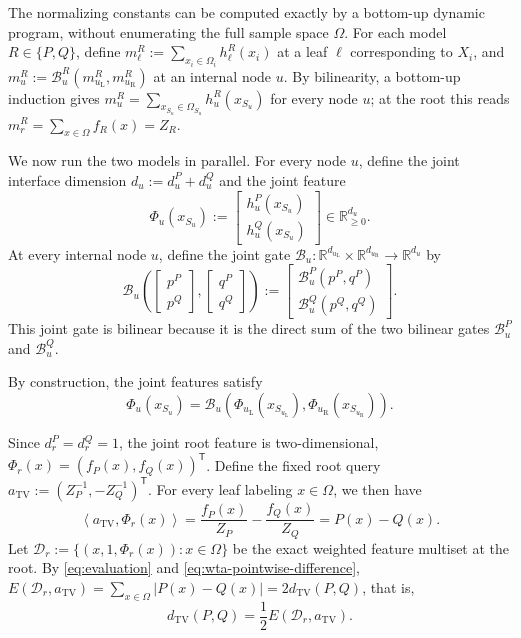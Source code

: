 \documentclass{article}
\begin{document}
The normalizing constants can be computed exactly by a bottom-up dynamic program, without enumerating the full sample space $\Omega$. For each model $R\in\{P,Q\}$, define $m_\ell^R:=\sum_{x_i\in\Omega_i}h_\ell^R(x_i)$ at a leaf $\ell$ corresponding to $X_i$, and $m_u^R:=\mathcal B_u^R(m_{u_{\mathrm L}}^R,m_{u_{\mathrm R}}^R)$ at an internal node $u$. By bilinearity, a bottom-up induction gives $m_u^R=\sum_{x_{S_u}\in\Omega_{S_u}}h_u^R(x_{S_u})$ for every node $u$; at the root this reads $m_r^R=\sum_{x\in\Omega}f_R(x)=Z_R$.

We now run the two models in parallel. For every node $u$, define the joint interface dimension $d_u:=d_u^P+d_u^Q$ and the joint feature
\begin{equation*}
\Phi_u(x_{S_u}) := \begin{bmatrix} h_u^P(x_{S_u})\\ h_u^Q(x_{S_u}) \end{bmatrix} \in\mathbb R_{\geq0}^{d_u}.
\end{equation*}
At every internal node $u$, define the joint gate $\mathcal B_u:\mathbb R^{d_{u_{\mathrm L}}}\times\mathbb R^{d_{u_{\mathrm R}}}\to\mathbb R^{d_u}$ by
\begin{equation*}
\mathcal B_u\left(\begin{bmatrix}p^P\\p^Q\end{bmatrix},\begin{bmatrix}q^P\\q^Q\end{bmatrix}\right) := \begin{bmatrix} \mathcal B_u^P(p^P,q^P)\\ \mathcal B_u^Q(p^Q,q^Q) \end{bmatrix}.
\end{equation*}
This joint gate is bilinear because it is the direct sum of the two bilinear gates $\mathcal B_u^P$ and $\mathcal B_u^Q$.

By construction, the joint features satisfy
\begin{equation*}
\Phi_u(x_{S_u}) = \mathcal B_u\left(\Phi_{u_{\mathrm L}}(x_{S_{u_{\mathrm L}}}), \Phi_{u_{\mathrm R}}(x_{S_{u_{\mathrm R}}})\right).
\end{equation*}

Since $d_r^P=d_r^Q=1$, the joint root feature is two-dimensional, $\Phi_r(x)=(f_P(x),f_Q(x))^{\mathsf T}$. Define the fixed root query $a_{\mathrm{TV}}:=(Z_P^{-1},-Z_Q^{-1})^{\mathsf T}$. For every leaf labeling $x\in\Omega$, we then have
\begin{equation}
\label{eq:wta-pointwise-difference}
\left\langle a_{\mathrm{TV}},\Phi_r(x)\right\rangle = \frac{f_P(x)}{Z_P}-\frac{f_Q(x)}{Z_Q} = P(x)-Q(x).
\end{equation}
Let $\mathcal D_r:=\{(x,1,\Phi_r(x)):x\in\Omega\}$ be the exact weighted feature multiset at the root. By \eqref{eq:evaluation} and \eqref{eq:wta-pointwise-difference}, $E(\mathcal D_r,a_{\mathrm{TV}})=\sum_{x\in\Omega}|P(x)-Q(x)|=2d_{\mathrm{TV}}(P,Q)$, that is,
\begin{equation*}
d_{\mathrm{TV}}(P,Q) = \frac12 E(\mathcal D_r,a_{\mathrm{TV}}).
\end{equation*}
\end{document}
